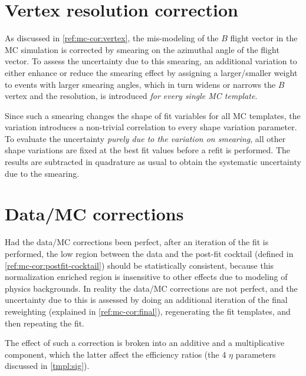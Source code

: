 

\section{Vertex resolution correction}
\label{sys-cor-vtx}

As discussed in \cref{ref:mc-cor:vertex},
the mis-modeling of the $B$ flight vector in the MC simulation is corrected by
smearing on the azimuthal angle of the flight vector.
To assess the uncertainty due to this smearing,
an additional variation to either enhance or reduce the smearing effect
by assigning a larger/smaller weight to events with larger smearing angles,
which in turn widens or narrows the $B$ vertex and the \mmSq resolution,
is introduced \emph{for every single MC template}.

Since such a smearing changes the shape of fit variables for all MC templates,
the variation introduces a non-trivial correlation to every
shape variation parameter.
To evaluate the uncertainty \emph{purely due to the variation on smearing},
all other shape variations are fixed at the best fit values before a refit is
performed.
The results are subtracted in quadrature as usual to obtain the systematic
uncertainty due to the smearing.


\section{Data/MC corrections}
\label{sys-cor-rwt}

Had the data/MC corrections been perfect,
after an iteration of the fit is performed,
the low \mmSq region between the data and the post-fit cocktail
(defined in \cref{ref:mc-cor:postfit-cocktail}) should be statistically
consistent,
because this normalization enriched region is insensitive to other effects
due to modeling of physics backgrounds.
In reality the data/MC corrections are not perfect,
and the uncertainty due to this is assessed by doing an additional iteration of
the final reweighting (explained in \cref{ref:mc-cor:final}),
regenerating the fit templates,
and then repeating the fit.

The effect of such a correction is broken into an additive and a multiplicative
component, which the latter affect the efficiency ratios
(the 4 $\eta$ parameters discussed in \cref{tmpl:sig}).


